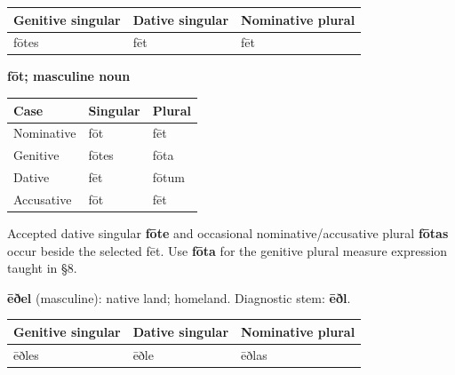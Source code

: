 \par\begingroup
\fontsize{10.5}{13.2}\selectfont
\setlength{\LTleft}{0pt}\setlength{\LTright}{\fill}
\noindent
\begin{tabular}{@{}>{\raggedright\arraybackslash}p{39.24mm}>{\raggedright\arraybackslash}p{36.31mm}>{\raggedright\arraybackslash}p{42.82mm}@{}}
\toprule
\textbf{Genitive singular} & \textbf{Dative singular} & \textbf{Nominative plural} \\
\midrule
fōtes & fēt & fēt \\
\bottomrule
\end{tabular}
\par\endgroup

\textbf{fōt; masculine noun}

\par\begingroup
\fontsize{10.5}{13.2}\selectfont
\setlength{\LTleft}{0pt}\setlength{\LTright}{\fill}
\noindent
\begin{tabular}{@{}>{\raggedright\arraybackslash}p{39.46mm}>{\raggedright\arraybackslash}p{39.46mm}>{\raggedright\arraybackslash}p{39.46mm}@{}}
\toprule
\textbf{Case} & \textbf{Singular} & \textbf{Plural} \\
\midrule
Nominative & fōt & fēt \\
Genitive & fōtes & fōta \\
Dative & fēt & fōtum \\
Accusative & fōt & fēt \\
\bottomrule
\end{tabular}
\par\endgroup

Accepted dative singular \textbf{fōte} and occasional nominative/\allowbreak{}accusative plural \textbf{fōtas} occur beside the selected fēt. Use \textbf{fōta} for the genitive plural measure expression taught in §8.

\textbf{ēðel} (masculine): native land; homeland. Diagnostic stem: \textbf{ēðl}.

\par\begingroup
\fontsize{10.5}{13.2}\selectfont
\setlength{\LTleft}{0pt}\setlength{\LTright}{\fill}
\noindent
\begin{tabular}{@{}>{\raggedright\arraybackslash}p{39.24mm}>{\raggedright\arraybackslash}p{36.31mm}>{\raggedright\arraybackslash}p{42.82mm}@{}}
\toprule
\textbf{Genitive singular} & \textbf{Dative singular} & \textbf{Nominative plural} \\
\midrule
ēðles & ēðle & ēðlas \\
\bottomrule
\end{tabular}
\par\endgroup

